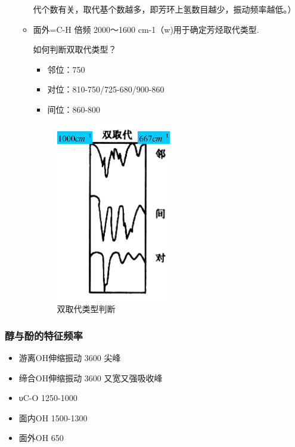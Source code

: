 \begin{itemize}
\begin{itemize}
        代个数有关，取代基个数越多，即芳环上氢数目越少，振动频率越低。）
        \item 面外=C-H     倍频 2000～1600 cm-1（w)用于确定芳烃取代类型.
        \begin{note}
            如何判断双取代类型？ 
            \begin{itemize}
                    \item 邻位：750
                    \item 对位：810-750/725-680/900-860
                    \item 间位：860-800
            \end{itemize}
            \begin{figure}[ht]
                \centering
                \includegraphics[width=5cm]{image/chp5_double.png}
                \caption{双取代类型判断}
                \label{fig:double}
            \end{figure}
        \end{note}
    \end{itemize}
\end{itemize}
\subsubsection*{醇与酚的特征频率}
\begin{itemize}
    \item 游离OH伸缩振动  3600      尖峰
    \item 缔合OH伸缩振动  3600     又宽又强吸收峰
    \item υC-O             1250-1000   
    \item 面内OH           1500-1300  
    \item 面外OH         650 
\end{itemize}

